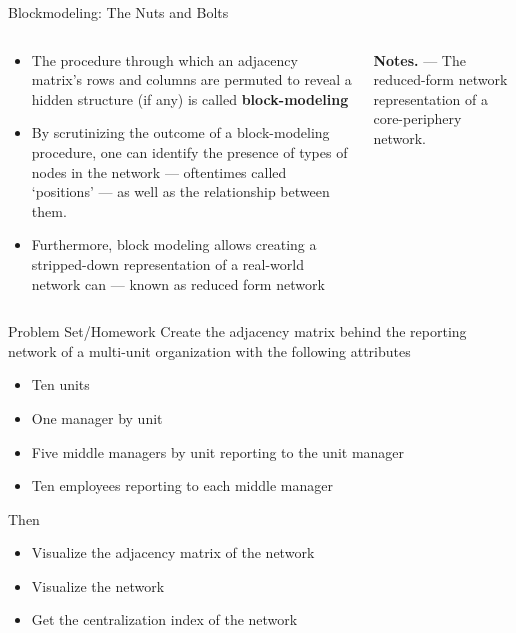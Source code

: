 \documentclass[notes, aspectratio=1610]{beamer}
\begin{document}
\begin{frame}{Blockmodeling: The Nuts and Bolts}{}
	\begin{columns}
		\small 
		\begin{column}{0.5\textwidth}
			\begin{itemize}
				\item 
				The procedure through which an adjacency matrix's rows and
				columns are permuted to reveal a hidden structure (if
				any) is called \textbf{block-modeling} \cite{peixoto2014}
				\item 
				By scrutinizing the outcome of a block-modeling procedure,
				one can identify the presence of types of nodes 
				in the network --- oftentimes called `positions' --- 
				as well as the relationship between them.
				\item 
				Furthermore, block modeling allows creating 
				a stripped-down representation of a real-world network can 
				--- known as reduced form network
			\end{itemize}		
		\end{column}
		\begin{column}{0.5\textwidth}
			\centering

		\textbf{Notes.} --- The reduced-form network representation of a core-periphery 
		network.
		\end{column}
	\end{columns}
\end{frame}

\begin{frame}{Problem Set/Homework}{}
	Create the adjacency matrix behind the reporting network of a 
	multi-unit organization with the following attributes
	\begin{itemize}
		\item Ten units
		\item One manager by unit
		\item Five middle managers by unit reporting to the unit manager
		\item Ten employees reporting to each middle manager 
	\end{itemize}

	Then
	\begin{itemize}
		\item 
		Visualize the adjacency matrix of the network
		\item 
		Visualize the network
		\item 
		Get the centralization index of the network
	\end{itemize}
\end{frame}
\end{document}
